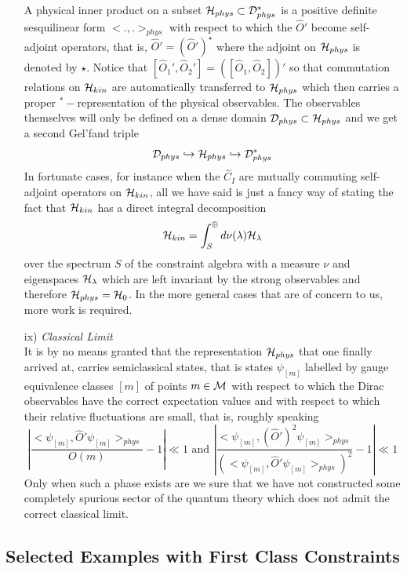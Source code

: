 \documentclass[12pt]{report}
\def\be{\begin{equation}}
\def\ee{\end{equation}}
\begin{document}
\begin{itemize}
A physical inner product on a subset ${\cal H}_{phys}\subset 
{\cal D}_{phys}^\ast$ is a positive definite sesquilinear form 
$<.,.>_{phys}$ with respect to which the $\hat{O}'$ become self-adjoint
operators, that is, $\hat{O}'=(\hat{O}')^\star$ where 
the adjoint on ${\cal H}_{phys}$ is denoted by $\star$. Notice that 
$[\hat{O}_1',\hat{O}_2']=([\hat{O}_1,\hat{O}_2])'$ 
so that commutation 
relations on ${\cal H}_{kin}$ are automatically transferred to 
${\cal H}_{phys}$ which then carries a proper $^\ast-$representation of 
the physical observables. The observables themselves will only be defined 
on a dense domain ${\cal D}_{phys}\subset {\cal H}_{phys}$ and we get a 
second Gel'fand triple
\be \label{1.3.5} 
{\cal D}_{phys}\hookrightarrow {\cal H}_{phys} 
\hookrightarrow {\cal D}_{phys}^\ast
\ee
In fortunate cases, for instance when the $\hat{C}_I$ are mutually commuting
self-adjoint operators on ${\cal H}_{kin}$, all we have said is just a 
fancy way of stating the fact that ${\cal H}_{kin}$ has a direct integral
decomposition
\be \label{1.3.6}
{\cal H}_{kin}=\int_S^\oplus d\nu(\lambda) {\cal H}_\lambda
\ee
over the spectrum $S$ of the constraint algebra with a measure $\nu$ and 
eigenspaces ${\cal H}_\lambda$ which are left invariant by the strong 
observables and therefore ${\cal H}_{phys}={\cal H}_0$.
In the more general cases that are of concern to us, more work is required.
%
\item[ix)] {\it Classical Limit}\\
It is by no means granted that the representation ${\cal H}_{phys}$
that one finally arrived at, carries semiclassical states, that is states
$\psi_{[m]}$ labelled by gauge equivalence classes $[m]$ of points 
$m\in {\cal M}$ with respect to which the Dirac observables have the correct
expectation values and with respect to which their relative fluctuations 
are small, that is, roughly speaking
\be \label{1.3.7}
|\frac{<\psi_{[m]},\hat{O}'\psi_{[m]}>_{phys}}{O(m)}-1|\ll 1
\mbox{ and }
|\frac{<\psi_{[m]},(\hat{O}')^2\psi_{[m]}>_{phys}}
{(<\psi_{[m]},\hat{O}'\psi_{[m]}>_{phys})^2}-1|\ll 1
\ee
Only when such a phase exists are we sure that we have not constructed some
completely spurious sector of the quantum theory which does not admit the 
correct classical limit.
%
\end{itemize}
%

\subsection{Selected Examples with First Class Constraints}
\label{s1.3.2}
\end{document}
